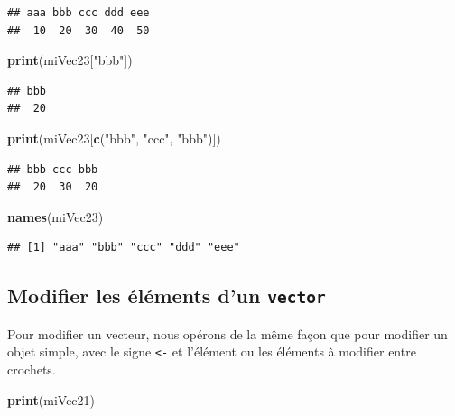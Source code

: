 \documentclass[twoside,symmetric]{book}
\newenvironment{Shaded}{}{}
\newcommand{\KeywordTok}[1]{\textbf{#1}}
\newcommand{\NormalTok}[1]{#1}
\newcommand{\StringTok}[1]{#1}
\begin{document}
\begin{verbatim}
## aaa bbb ccc ddd eee 
##  10  20  30  40  50
\end{verbatim}

\begin{Shaded}
\begin{Highlighting}[]
\KeywordTok{print}\NormalTok{(miVec23[}\StringTok{"bbb"}\NormalTok{])}
\end{Highlighting}
\end{Shaded}

\begin{verbatim}
## bbb 
##  20
\end{verbatim}

\begin{Shaded}
\begin{Highlighting}[]
\KeywordTok{print}\NormalTok{(miVec23[}\KeywordTok{c}\NormalTok{(}\StringTok{"bbb"}\NormalTok{, }\StringTok{"ccc"}\NormalTok{, }\StringTok{"bbb"}\NormalTok{)])}
\end{Highlighting}
\end{Shaded}

\begin{verbatim}
## bbb ccc bbb 
##  20  30  20
\end{verbatim}

\begin{Shaded}
\begin{Highlighting}[]
\KeywordTok{names}\NormalTok{(miVec23)}
\end{Highlighting}
\end{Shaded}

\begin{verbatim}
## [1] "aaa" "bbb" "ccc" "ddd" "eee"
\end{verbatim}

\hypertarget{modifier-les-uxe9luxe9ments-dun-vector}{%
\subsection{\texorpdfstring{Modifier les éléments d'un \texttt{vector}}{Modifier les éléments d'un vector}}\label{modifier-les-uxe9luxe9ments-dun-vector}}

Pour modifier un vecteur, nous opérons de la même façon que pour modifier un objet simple, avec le signe \texttt{\textless{}-} et l'élément ou les éléments à modifier entre crochets.

\begin{Shaded}
\begin{Highlighting}[]
\KeywordTok{print}\NormalTok{(miVec21)}
\end{Highlighting}
\end{Shaded}
\end{document}
